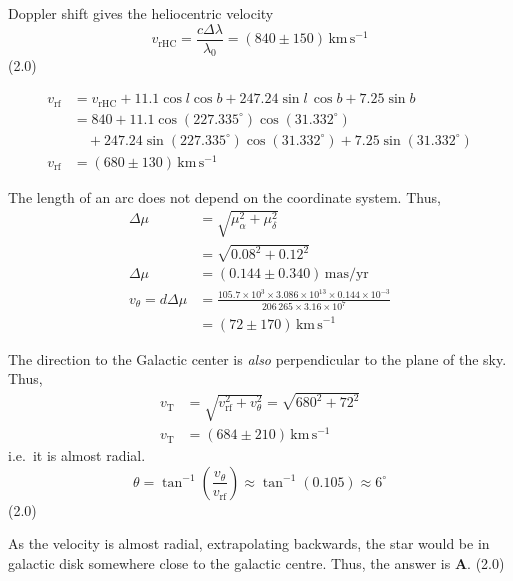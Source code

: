 \begin{description}
\begin{description}
    Doppler shift gives the heliocentric velocity
    \[
      v_{\mathrm{rHC}} = \frac{c\Delta\lambda}{\lambda_0}
        = (840\pm150)\,\mathrm{km\,s^{-1}}
    \]
    \hfill(2.0)
  \item[ii.]
    \begin{align*}
      v_{\mathrm{rf}} &= v_{\mathrm{rHC}} + 11.1\cos l\cos b
          + 247.24\sin l\,\cos b + 7.25\sin b\\
        &= 840 + 11.1\cos(227.335^\circ)\cos(31.332^\circ)\\
        &\quad + 247.24\sin(227.335^\circ)\cos(31.332^\circ)
          + 7.25\sin(31.332^\circ)\\
      v_{\mathrm{rf}} &= (680\pm130)\,\mathrm{km\,s^{-1}} \tag*{(2.0)}
    \end{align*}
  \item[iii.] The length of an arc does not depend on the coordinate system.
    Thus,
    \begin{align*}
      \Delta\mu &= \sqrt{\mu_\alpha^2 + \mu_\delta^2}\\
        &= \sqrt{0.08^2 + 0.12^2}\\
      \Delta\mu &= (0.144\pm0.340)\,\mathrm{mas/yr} \tag*{(2.0)}\\
      v_\theta = d\Delta\mu
        &= \frac{105.7\times10^{3}\times3.086\times10^{13}
           \times0.144\times10^{-3}}{206\,265\times3.16\times10^{7}}\\
        &= (72\pm170)\,\mathrm{km\,s^{-1}} \tag*{(2.0)}
    \end{align*}
  \item[iv.] The direction to the Galactic center is \emph{also}
    perpendicular to the plane of the sky. Thus,
    \begin{align*}
      v_{\mathrm{T}} &= \sqrt{v_{\mathrm{rf}}^2 + v_\theta^2}
        = \sqrt{680^2 + 72^2}\\
      v_{\mathrm{T}} &= (684\pm210)\,\mathrm{km\,s^{-1}} \tag*{(2.0)}
    \end{align*}
    i.e.\ it is almost radial.
    \[
      \theta = \tan^{-1}\left(\frac{v_\theta}{v_{\mathrm{rf}}}\right)
        \approx \tan^{-1}(0.105) \approx 6^\circ
    \]
    \hfill(2.0)
  \item[v.] As the velocity is almost radial, extrapolating backwards, the
    star would be in galactic disk somewhere close to the galactic centre.
    Thus, the answer is \textbf{A}. \hfill(2.0)
  \end{description}
\item[(d)] \mbox{}
  \begin{description}

\end{description}
\end{description}

